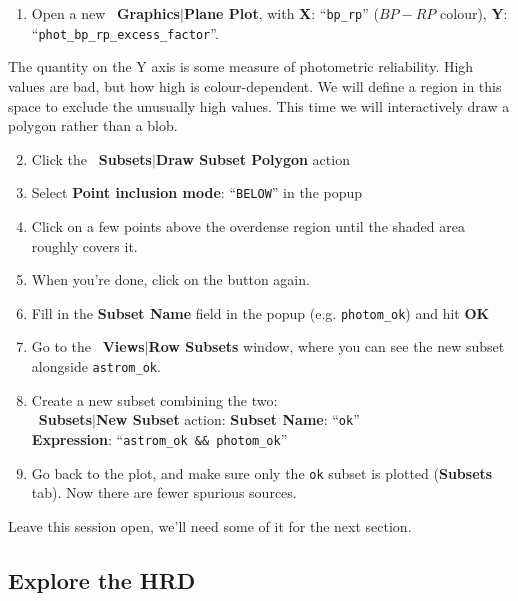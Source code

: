 \documentclass{article}
\newcommand{\buttimg}[1]
           {\mbox{\vtop{\vskip-2ex\hbox{\texttt{[image: \#1]}}}}}
\newcommand{\winfig}[2]
           {\vspace*{-0.5cm}
            \hspace*{0.5cm}\mbox{\vtop{\hbox{\texttt{[image: \#2]}}}}}
\newcommand{\lab}[1]{{\bf #1}}
\newcommand{\mb}[3]{\buttimg{#1}~\lab{#2}$\mid$\lab{#3}}
\newcommand{\entry}[2]{\lab{#1}: ``{\tt #2}''}
\begin{document}
\begin{minipage}[t]{11cm}
  \raggedright
  \begin{enumerate}
  \item Open a new \mb{planeplot_button.png}{Graphics}{Plane Plot}, with
        \entry{X}{bp\_rp} ($BP-RP$ colour),
        \entry{Y}{phot\_bp\_rp\_excess\_factor}.
  \end{enumerate}
  The quantity on the Y axis is some measure of photometric reliability.
  High values are bad, but how high is colour-dependent.
  We will define a region in this space to exclude the unusually high values.
  This time we will interactively draw a polygon rather than a blob.
  \begin{enumerate}
  \setcounter{enumi}{1}
  \item Click the \mb{poly2.png}{Subsets}{Draw Subset Polygon} action
  \item Select \entry{Point inclusion mode}{BELOW} in the popup
  \item Click on a few points above the overdense region until the shaded
        area roughly covers it.
  \item When you're done, click on the \buttimg{unpoly2.png} button again.
  \item Fill in the \lab{Subset Name} field in the popup
        (e.g. {\tt photom\_ok}) and hit \lab{OK}
  \item Go to the \mb{subsets_button.png}{Views}{Row Subsets} window,
        where you can see the new subset alongside {\tt astrom\_ok}.
  \item Create a new subset combining the two: \\
        \mb{plus_button.png}{Subsets}{New Subset} action: 
        \entry{Subset Name}{ok} \\
        \entry{Expression}{astrom\_ok \&\& photom\_ok}
  \item Go back to the plot, and make sure only the {\tt ok}
        subset is plotted (\lab{Subsets} tab).
        Now there are fewer spurious sources.
  \end{enumerate}
  Leave this session open, we'll need some of it for the next section.
\end{minipage}
\begin{minipage}[t]{8cm}
  \winfig{width=8cm}{hrd_photom.png}
\end{minipage}

\subsection{Explore the HRD}
\end{document}
